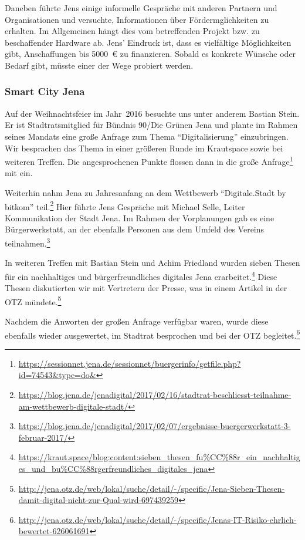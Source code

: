 \documentclass[ngerman]{scrartcl}
\begin{document}
Daneben führte Jens einige informelle Gespräche mit anderen Partnern und
Organisationen und versuchte, Informationen über Fördermglichkeiten zu
erhalten. Im Allgemeinen hängt dies vom betreffenden Projekt bzw. zu
beschaffender Hardware ab. Jens' Eindruck ist, dass es vielfältige Möglichkeiten
gibt, Anschaffungen bis \num{5000}~\euro{} zu finanzieren. Sobald es konkrete
Wünsche oder Bedarf gibt, müsste einer der Wege probiert werden.

\subsubsection{Smart City Jena}

Auf der Weihnachtsfeier im Jahr~2016 besuchte uns unter anderem Bastian
Stein. Er ist Stadtratsmitglied für Bündnis 90/Die Grünen Jena und plante im
Rahmen seines Mandats eine große Anfrage zum Thema \enquote{Digitalisierung}
einzubringen. Wir besprachen das Thema in einer größeren Runde im Krautspace
sowie bei weiteren Treffen. Die angesprochenen Punkte flossen dann in die große
Anfrage\footnote{\url{https://sessionnet.jena.de/sessionnet/buergerinfo/getfile.php?id=74543&type=do&}}
mit ein.

Weiterhin nahm Jena zu Jahresanfang an dem Wettbewerb \enquote{Digitale.Stadt by
bitkom}
teil.\footnote{\url{https://blog.jena.de/jenadigital/2017/02/16/stadtrat-beschliesst-teilnahme-am-wettbewerb-digitale-stadt/}}
Hier führte Jens Gespräche mit Michael Selle, Leiter Kommunikation der Stadt
Jena. Im Rahmen der Vorplanungen gab es eine Bürgerwerkstatt, an der ebenfalls
Personen aus dem Umfeld des Vereins
teilnahmen.\footnote{\url{https://blog.jena.de/jenadigital/2017/02/07/ergebnisse-buergerwerkstatt-3-februar-2017/}}

In weiteren Treffen mit Bastian Stein und Achim Friedland wurden sieben Thesen
für ein nachhaltiges und bürgerfreundliches digitales Jena
erarbeitet.\footnote{\url{https://kraut.space/blog:content:sieben_thesen_fu\%CC\%88r_ein_nachhaltiges_und_bu\%CC\%88rgerfreundliches_digitales_jena}}
Diese Thesen diskutierten wir mit Vertretern der Presse, was in einem Artikel in
der OTZ
mündete.\footnote{\url{http://jena.otz.de/web/lokal/suche/detail/-/specific/Jena-Sieben-Thesen-damit-digital-nicht-zur-Qual-wird-697439259}}

Nachdem die Anworten der großen Anfrage verfügbar waren, wurde diese ebenfalls
wieder ausgewertet, im Stadtrat besprochen und bei der OTZ
begleitet.\footnote{\url{http://jena.otz.de/web/lokal/suche/detail/-/specific/Jenas-IT-Risiko-ehrlich-bewertet-626061691}}
\end{document}
